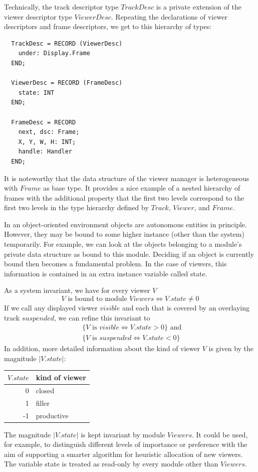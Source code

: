 Technically, the track descriptor type $TrackDesc$ is a private extension of the viewer descriptor
type $ViewerDesc$. Repeating the declarations of viewer descriptors and frame descriptors, we get to this hierarchy of types:
\begin{verbatim}
  TrackDesc = RECORD (ViewerDesc)
    under: Display.Frame
  END;

  ViewerDesc = RECORD (FrameDesc)
    state: INT
  END;

  FrameDesc = RECORD
    next, dsc: Frame;
    X, Y, W, H: INT;
    handle: Handler
  END;
\end{verbatim}

It is noteworthy that the data structure of the viewer manager is heterogeneous with $Frame$ as
base type. It provides a nice example of a nested hierarchy of frames with the additional property
that the first two levels correspond to the first two levels in the type hierarchy defined by $Track$,
$Viewer$, and $Frame$.

In an object-oriented environment objects are autonomous entities in principle. However, they may
be bound to some higher instance (other than the system) temporarily. For example, we can look
at the objects belonging to a module's private data structure as bound to this module. Deciding if
an object is currently bound then becomes a fundamental problem. In the case of viewers, this
information is contained in an extra instance variable called state.

As a system invariant, we have for every viewer $V$
\[ V\text{ is bound to module }Viewers \Leftrightarrow V.state \neq 0 \]
If we call any displayed viewer $visible$ and each that is covered by an overlaying track $suspended$, we can refine this invariant to
\begin{align*}
&\{ V\text{ is }visible  \Leftrightarrow V.state > 0 \}\text{ and }\\
&\{ V\text{ is }suspended\Leftrightarrow V.state < 0 \}
\end{align*}
In addition, more detailed information about the kind of viewer $V$ is given by the magnitude $|V.state|$:
\begin{table}[h!]
	\centering
	\begin{tabular}{r l}
		$V.state$ & kind of viewer \\\hline
		        0 & closed \\
		        1 & filler \\
		       -1 & productive
	\end{tabular}
\end{table}
The magnitude $|V.state|$ is kept invariant by module $Viewers$. It could be used, for example, to
distinguish different levels of importance or preference with the aim of supporting a smarter
algorithm for heuristic allocation of new viewers. The variable state is treated as read-only by
every module other than $Viewers$.

